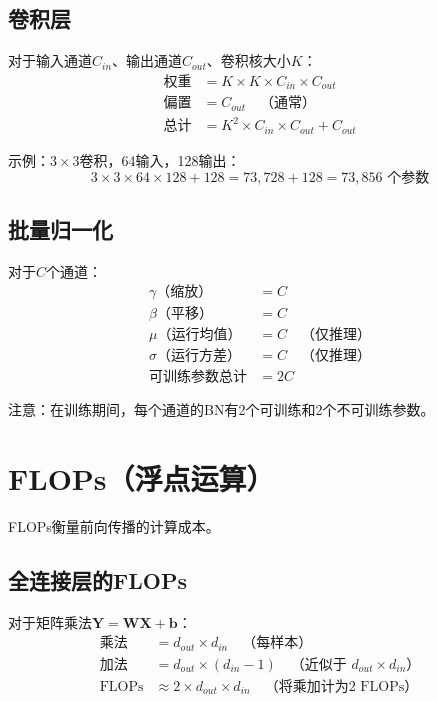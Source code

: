 \subsection{卷积层}

对于输入通道$C_{in}$、输出通道$C_{out}$、卷积核大小$K$：
\begin{align}
\text{权重} &= K \times K \times C_{in} \times C_{out} \\
\text{偏置} &= C_{out} \quad \text{（通常）} \\
\text{总计} &= K^2 \times C_{in} \times C_{out} + C_{out}
\end{align}

示例：$3\times3$卷积，64输入，128输出：
\begin{equation}
3 \times 3 \times 64 \times 128 + 128 = 73,728 + 128 = 73,856 \text{ 个参数}
\end{equation}

\subsection{批量归一化}

对于$C$个通道：
\begin{align}
\gamma \text{（缩放）} &= C \\
\beta \text{（平移）} &= C \\
\mu \text{（运行均值）} &= C \quad \text{（仅推理）} \\
\sigma \text{（运行方差）} &= C \quad \text{（仅推理）} \\
\text{可训练参数总计} &= 2C
\end{align}

注意：在训练期间，每个通道的BN有2个可训练和2个不可训练参数。

\section{FLOPs（浮点运算）}

FLOPs衡量前向传播的计算成本。

\subsection{全连接层的FLOPs}

对于矩阵乘法$\mathbf{Y} = \mathbf{W}\mathbf{X} + \mathbf{b}$：
\begin{align}
\text{乘法} &= d_{out} \times d_{in} \quad \text{（每样本）} \\
\text{加法} &= d_{out} \times (d_{in} - 1) \quad \text{（近似于 } d_{out} \times d_{in}\text{）} \\
\text{FLOPs} &\approx 2 \times d_{out} \times d_{in} \quad \text{（将乘加计为2 FLOPs）}
\end{align}

